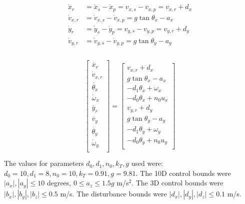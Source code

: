 \begin{equation}
\begin{aligned}
\dot x_r &= \dot x_s - \dot x_p = v_{x,s} - v_{x,p} = v_{x,r} + d_x\\
\dot v_{x,r} &= \dot v_{x,s} - \dot v_{x,p} = g \tan \theta_x - a_x\\
\dot y_r &= \dot y_s - \dot y_p = v_{y,s} - v_{y,p} = v_{y,r} + d_y\\
\dot v_{y,r} &= \dot v_{y,s} - \dot v_{y,p} = g \tan \theta_y - a_y\\
\end{aligned}
\end{equation}

\begin{equation}
\label{eq:Quad8DRel_dyn}
\begin{aligned}
\begin{array}{c}
\left[
\begin{array}{c}
\dot{x_r}\\
\dot v_{x,r}\\
\dot{\theta_{x}}\\
\dot\omega_{x}\\
\dot{y_r}\\
\dot{v_{y}}\\
\dot{\theta_{y}}\\
\dot\omega_{y}\\
\end{array}
\right]
=
\left[
\begin{array}{c}
v_{x,r} + d_x\\
g \tan \theta_x - a_x\\
-d_1 \theta_x + \omega_x\\
-d_0 \theta_x + n_0 u_x\\
v_{y,r} + d_y\\
g \tan \theta_y - a_y\\
-d_1 \theta_y + \omega_y\\
-d_0 \theta_y + n_0 u_y\\
\end{array}
\right]
\end{array}\\
\end{aligned}
\end{equation}
The values for parameters $d_0,d_1,n_0,k_T,g$ used were: $d_0=10,d_1=8,n_0=10,k_T=0.91,g=9.81$. The 10D control bounds were $|a_x|,|a_y|\leq10$ degrees, $0\leq a_z\leq 1.5g$ m/s$^{2}$. The 3D control bounds were $|b_x|,|b_y|,|b_z|\leq0.5$ m/s. The disturbance bounds were $|d_x|,|d_y|,|d_z|\leq0.1$ m/s.

